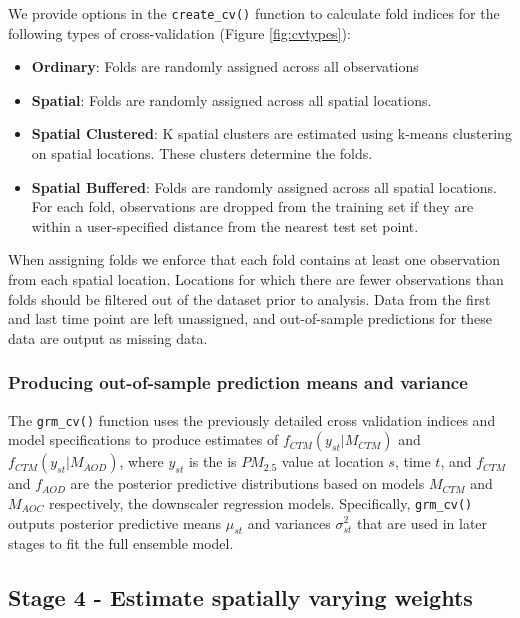 We provide options in the \texttt{create\_cv()} function to calculate fold indices for the following types of cross-validation (Figure \ref{fig:cvtypes}):

\begin{itemize}
  \item \textbf{Ordinary}: Folds are randomly assigned across all observations
  \item \textbf{Spatial}: Folds are randomly assigned across all spatial locations. 
  \item \textbf{Spatial Clustered}: K spatial clusters are estimated using k-means clustering on spatial locations. These clusters determine the folds. 
  \item \textbf{Spatial Buffered}: Folds are randomly assigned across all spatial locations. For each fold, observations are dropped from the training set if they are within a user-specified distance from the nearest test set point. 
\end{itemize}

When assigning folds we enforce that each fold contains at least one observation from each spatial location.
Locations for which there are fewer observations than folds should be filtered out of the dataset prior to analysis.
Data from the first and last time point are left unassigned, and out-of-sample predictions for these data are output as missing data.

\subsubsection*{Producing out-of-sample prediction means and variance}

The \texttt{grm\_cv()} function uses the previously detailed cross validation indices and model specifications to produce estimates of $f_{CTM}(y_{st} | M_{CTM})$ and $f_{CTM}(y_{st} | M_{AOD})$, where $y_{st}$ is the is $PM_{2.5}$ value at location $s$, time $t$, and $f_{CTM}$ and $f_{AOD}$ are the posterior predictive distributions based on models $M_{CTM}$ and $M_{AOC}$ respectively, the downscaler regression models. 
Specifically, \texttt{grm\_cv()} outputs posterior predictive means $\mu_{st}$ and variances $\sigma^2_{st}$ that are used in later stages to fit the full ensemble model. 



\subsection*{Stage 4 - Estimate spatially varying weights}

